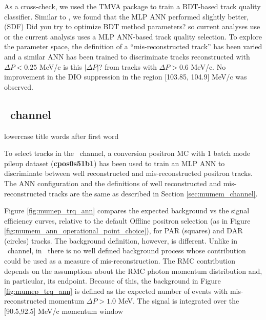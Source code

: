 As a cross-check, we used the TMVA package to train a BDT-based track quality classifier.
Similar to \cite{MU2E_33150_ANN_TRAINING}, we found that the MLP ANN performed slightly better, {\blue (SDF) Did you try to optimize BDT method parameters?}
so  {\blue current analyses use or the current analysis uses} a MLP ANN-based track quality selection.
To explore the parameter space, the definition of a ``mis-reconstructed track'' has been varied and
a similar ANN has been trained to discriminate tracks reconstructed with $\Delta{P} < 0.25$ MeV/c {\blue is this $|\Delta{P}|$?}
from tracks with $\Delta{P} > 0.6$ MeV/c. No improvement in the DIO
suppression in the region [103.85, 104.9] MeV/c was observed. 

\newpage
\subsection{\MuToEp\ channel}
\label{sec:mumep_channel}
{\blue lowercase title words after first word}

To select tracks in {\blue the} \MuToEp\ channel, a  {\blue conversion positron MC with 1 batch}
mode pileup  {\blue dataset ({\bf cpos0s51b1})}
has been used to train  {\blue an} MLP ANN to discriminate between  {\blue well reconstructed}
and mis-reconstructed positron tracks.
The ANN configuration and the definitions of  well reconstructed and mis-reconstructed tracks are
the same as described in Section \ref{sec:mumem_channel}.

Figure \ref{fig:mumep_trq_ann} compares the expected background vs the signal efficiency curves,
 {\blue relative to the default Offline positron selection (as in Figure \ref{fig:mumem_ann_operational_point_choice})},
for PAR (squares) and DAR {\blue (}circles) tracks.
The background definition, however, is different. Unlike in \MuToEm\ channel, in \MuToEp\ there is
no well defined background process  {\blue whose} contribution could be used as a measure of mis-reconstruction.
The RMC contribution depends on the assumptions about the RMC photon momentum distribution and,
in particular, its endpoint. Because of this, the background in Figure \strike{\ref{fig:mumem_ann_operational_point_choice}}
{\blue \ref{fig:mumep_trq_ann}}
is defined as the expected number of events with  {\blue mis-reconstructed} momentum $\Delta{P} > 1.0$ MeV.
The signal is integrated over the [90.5,92.5] MeV/c momentum window

